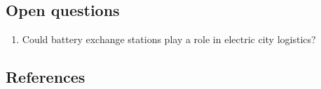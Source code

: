 \documentclass[
]{book}
\providecommand{\tightlist}{%
  \setlength{\itemsep}{0pt}\setlength{\parskip}{0pt}}
\begin{document}
\hypertarget{open-questions-34}{%
\subsection*{Open questions}\label{open-questions-34}}

\begin{enumerate}
\def\labelenumi{\arabic{enumi}.}
\tightlist
\item
  Could battery exchange stations play a role in electric city logistics?
\end{enumerate}

\hypertarget{references-34}{%
\subsection*{References}\label{references-34}}
\end{document}
